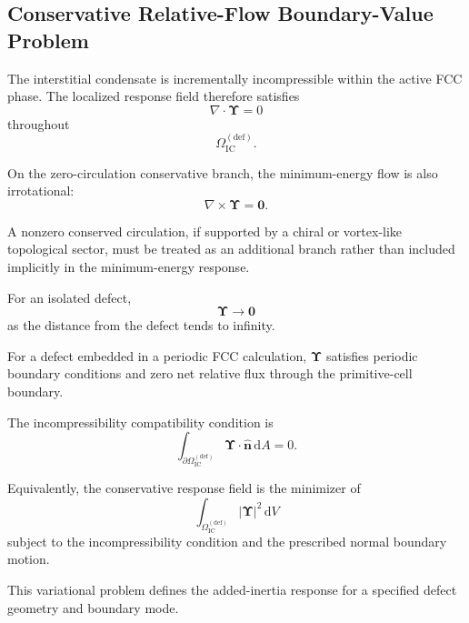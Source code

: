 \subsection{Conservative Relative-Flow Boundary-Value Problem}

The interstitial condensate is incrementally incompressible within the active FCC phase. The localized response field therefore satisfies
\begin{equation}
    \boxed{ \nabla\cdot\boldsymbol{\Upsilon} = 0 }
\end{equation}
throughout
\begin{equation}
    \Omega_{\mathrm{IC}}^{(\mathrm{def})}.
\end{equation}

On the zero-circulation conservative branch, the minimum-energy flow is also irrotational:
\begin{equation}
    \boxed{ \nabla\times\boldsymbol{\Upsilon} = \mathbf{0} }.
\end{equation}

A nonzero conserved circulation, if supported by a chiral or vortex-like topological sector, must be treated as an additional branch rather than included implicitly in the minimum-energy response.

For an isolated defect,
\begin{equation}
    \boldsymbol{\Upsilon} \rightarrow \mathbf{0}
\end{equation}
as the distance from the defect tends to infinity.

For a defect embedded in a periodic FCC calculation, $\boldsymbol{\Upsilon}$ satisfies periodic boundary conditions and zero net relative flux through the primitive-cell boundary.

The incompressibility compatibility condition is
\begin{equation}
    \boxed{ \int_{\partial\Omega_{\mathrm{IC}}^{(\mathrm{def})}} \boldsymbol{\Upsilon}\cdot\hat{\mathbf{n}} \, \mathrm{d}A = 0 }.
\end{equation}

Equivalently, the conservative response field is the minimizer of
\begin{equation}
    \int_{\Omega_{\mathrm{IC}}^{(\mathrm{def})}} \left| \boldsymbol{\Upsilon} \right|^2 \, \mathrm{d}V
\end{equation}
subject to the incompressibility condition and the prescribed normal boundary motion.

This variational problem defines the added-inertia response for a specified defect geometry and boundary mode.

